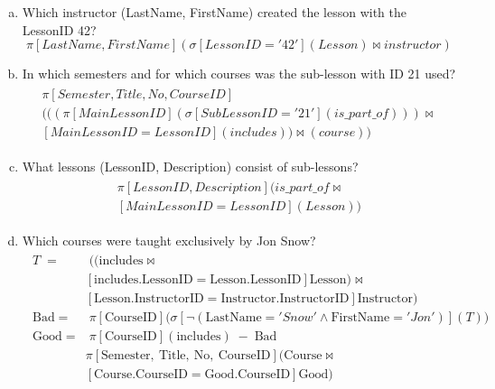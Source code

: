 \documentclass{article}
\begin{document}
\printfront

\task{}

\begin{enumerate}[(a)]
\item
Which instructor (LastName, FirstName) created the lesson with the LessonID 42?
\begin{equation}
\pi\left[LastName,FirstName\right](\sigma\left[LessonID='42'\right](Lesson)\Join instructor)
\end{equation}

\item
In which semesters and for which courses was the sub-lesson with ID 21 used?
\begin{align}
    \begin{split}
\pi\left[Semester, Title, No, CourseID\right]\\
(((\pi\left[MainLessonID\right](\sigma\left[SubLessonID = '21'\right](is\_part\_of)))\Join \\
\left[MainLessonID = LessonID\right](includes))\Join(course))
    \end{split}
\end{align}

\item
What lessons (LessonID, Description) consist of sub-lessons?
\begin{align}
    \begin{split}
\pi\left[LessonID,Description\right](is\_part\_of\Join \\
\left[MainLessonID=LessonID\right](Lesson))
    \end{split}
\end{align}

\item
Which courses were taught exclusively by Jon Snow?
\begin{align}
    \begin{split}
T \;=&\; ((\text{includes} \Join \\[-1pt]
&\left[\text{includes.LessonID}=\text{Lesson.LessonID}\right] \text{Lesson}) \Join \\[-1pt]
&\left[\text{Lesson.InstructorID}=\text{Instructor.InstructorID}\right] \text{Instructor})\\[4pt]
\text{Bad} \;=&\; \pi\left[\text{CourseID}\right]\big(\sigma\left[\neg(\text{LastName}='Snow' \land \text{FirstName}='Jon')\right](T)\big)\\[4pt]
\text{Good} \;=&\; \pi\left[\text{CourseID}\right](\text{includes})\;-\;\text{Bad}\\[4pt]
&\pi\left[\text{Semester},\ \text{Title},\ \text{No},\ \text{CourseID}\right]
\big(\text{Course} \Join \\[-1pt]
&\left[\text{Course.CourseID}=\text{Good.CourseID}\right] \text{Good}\big)
    \end{split}
\end{align}




\end{enumerate}
\end{document}
